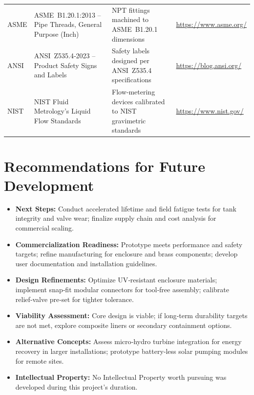 \documentclass[12pt]{report}
\begin{document}
\begin{longtable}{%
    p{1.2cm}   %
    p{4cm}   %
    p{6cm}   %
    p{3.8cm}   %
}
ASME  & ASME B1.20.1:2013 – Pipe Threads, General Purpose (Inch)
      & NPT fittings machined to ASME B1.20.1 dimensions
      & \url{https://www.asme.org/} \\

ANSI  & ANSI Z535.4‑2023 – Product Safety Signs and Labels
      & Safety labels designed per ANSI Z535.4 specifications
      & \url{https://blog.ansi.org/} \\

NIST  & NIST Fluid Metrology’s Liquid Flow Standards
      & Flow‑metering devices calibrated to NIST gravimetric standards
      & \url{https://www.nist.gov/} \\

\end{longtable}

\section{Recommendations for Future Development}
\begin{itemize}
  \item \textbf{Next Steps:} Conduct accelerated lifetime and field fatigue tests for tank integrity and valve wear; finalize supply chain and cost analysis for commercial scaling.
  \item \textbf{Commercialization Readiness:} Prototype meets performance and safety targets; refine manufacturing for enclosure and brass components; develop user documentation and installation guidelines.
  \item \textbf{Design Refinements:} Optimize UV‑resistant enclosure materials; implement snap‑fit modular connectors for tool‑free assembly; calibrate relief‑valve pre‑set for tighter tolerance.
  \item \textbf{Viability Assessment:} Core design is viable; if long‑term durability targets are not met, explore composite liners or secondary containment options.
  \item \textbf{Alternative Concepts:} Assess micro‑hydro turbine integration for energy recovery in larger installations; prototype battery‑less solar pumping modules for remote sites.
  \item \textbf{Intellectual Property:} No Intellectual Property worth pursuing was developed during this project's duration.
\end{itemize}

\end{document}
